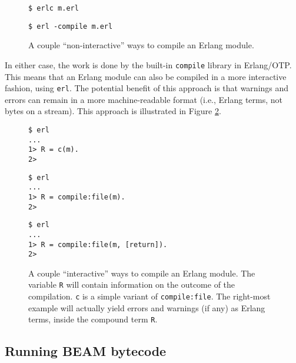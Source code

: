 \begin{figure}[h!]
\begin{minipage}[t]{0.5\textwidth}
\begin{lstlisting}
$ erlc m.erl
\end{lstlisting}
\end{minipage}%
\begin{minipage}[t]{0.5\textwidth}
\begin{lstlisting}
$ erl -compile m.erl
\end{lstlisting}
\end{minipage}%
\caption{A couple ``non-interactive'' ways to compile an Erlang
module.}
\label{fig:erlc}
\end{figure}

In either case, the work is done by the built-in \texttt{compile}
library in Erlang/OTP. This means that an Erlang module can also be
compiled in a more interactive fashion, using \texttt{erl}. The
potential benefit of this approach is that warnings and errors can
remain in a more machine-readable format (i.e., Erlang terms, not
bytes on a stream). This approach is illustrated in Figure
\ref{fig:erl-c}.

\begin{figure}[h!]
\begin{minipage}[t]{0.2\textwidth}
\begin{lstlisting}
$ erl
...
1> R = c(m).
2>
\end{lstlisting}
\end{minipage}%
\begin{minipage}[t]{0.35\textwidth}
\begin{lstlisting}
$ erl
...
1> R = compile:file(m).
2>
\end{lstlisting}
\end{minipage}%
\begin{minipage}[t]{0.45\textwidth}
\begin{lstlisting}
$ erl
...
1> R = compile:file(m, [return]).
2>
\end{lstlisting}
\end{minipage}%
\caption{A couple ``interactive'' ways to compile an Erlang module.
The variable \texttt{R} will contain information on the outcome of the
compilation. \texttt{c} is a simple variant of \texttt{compile:file}.
The right-most example will actually yield errors and warnings (if
any) as Erlang terms, inside the compound term \texttt{R}.}
\label{fig:erl-c}
\end{figure}

\subsection{Running BEAM bytecode}

